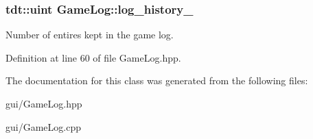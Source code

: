 \subsubsection[{\texorpdfstring{log\+\_\+history\+\_\+}{log_history_}}]{\setlength{\rightskip}{0pt plus 5cm}tdt\+::uint Game\+Log\+::log\+\_\+history\+\_\+\hspace{0.3cm}{\ttfamily [private]}}\hypertarget{class_game_log_aeb1a5ef1aada991b96ec36d10ad04e38}{}\label{class_game_log_aeb1a5ef1aada991b96ec36d10ad04e38}


Number of entires kept in the game log. 



Definition at line 60 of file Game\+Log.\+hpp.



The documentation for this class was generated from the following files\+:\begin{DoxyCompactItemize}
\item 
gui/Game\+Log.\+hpp\item 
gui/Game\+Log.\+cpp\end{DoxyCompactItemize}
